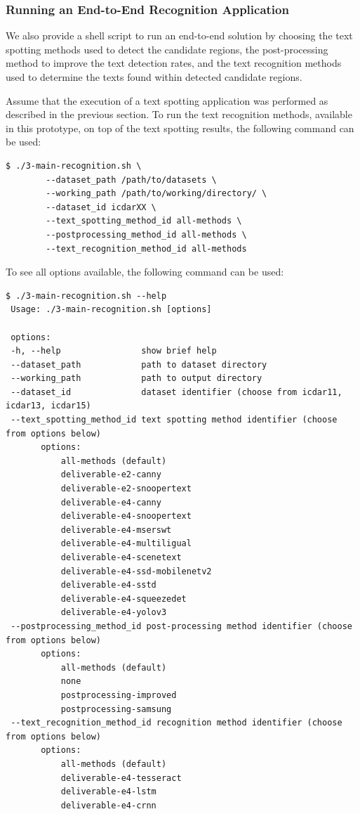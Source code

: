 \subsubsection{Running an End-to-End Recognition Application}

We also provide a shell script to run an end-to-end solution by choosing the text spotting methods used to detect the candidate regions, the post-processing method to improve the text detection rates, and the text recognition methods used to determine the texts found within detected candidate regions.

Assume that the execution of a text spotting application was performed as described in the previous section. To run the text recognition methods, available in this prototype, on top of the text spotting results, the following command can be used:

\begin{lstlisting}[style=fancyterminal]
 $ ./3-main-recognition.sh \
        --dataset_path /path/to/datasets \
        --working_path /path/to/working/directory/ \
        --dataset_id icdarXX \
        --text_spotting_method_id all-methods \
        --postprocessing_method_id all-methods \
        --text_recognition_method_id all-methods
\end{lstlisting}

To see all options available, the following command can be used:

\begin{lstlisting}[style=fancyterminal]
 $ ./3-main-recognition.sh --help
 Usage: ./3-main-recognition.sh [options]
 
 options:
 -h, --help                show brief help
 --dataset_path            path to dataset directory
 --working_path            path to output directory
 --dataset_id              dataset identifier (choose from icdar11, icdar13, icdar15)
 --text_spotting_method_id text spotting method identifier (choose from options below)
       options:
           all-methods (default)
           deliverable-e2-canny
           deliverable-e2-snoopertext
           deliverable-e4-canny
           deliverable-e4-snoopertext
           deliverable-e4-mserswt
           deliverable-e4-multiligual
           deliverable-e4-scenetext
           deliverable-e4-ssd-mobilenetv2
           deliverable-e4-sstd
           deliverable-e4-squeezedet
           deliverable-e4-yolov3
 --postprocessing_method_id post-processing method identifier (choose from options below)
       options:
           all-methods (default)
           none
           postprocessing-improved
           postprocessing-samsung
 --text_recognition_method_id recognition method identifier (choose from options below)
       options:
           all-methods (default)
           deliverable-e4-tesseract
           deliverable-e4-lstm
           deliverable-e4-crnn
\end{lstlisting}


